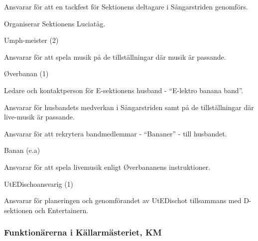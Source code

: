 \documentclass[10pt]{article}
\begin{document}
\begin{emptylist}
\begin{dashlist}
            \item Ansvarar för att en tackfest för Sektionens deltagare i Sångarstriden genomförs.
            \item Organiserar Sektionens Luciatåg.
        \end{dashlist}
    \item Umph-meister (2)
        \begin{dashlist}
        \item Ansvarar för att spela musik på de tillställningar där musik är passande.
        \end{dashlist}
    \item Øverbanan (1)
        \begin{dashlist}
        \item Ledare och kontaktperson för E-sektionens husband - “E-lektro banana band”.
        \item Ansvarar för husbandets medverkan i Sångarstriden samt på de tillställningar där live-musik är passande.
        \item Ansvarar för att rekrytera bandmedlemmar - “Bananer” - till husbandet.
        \end{dashlist}
    \item Banan (e.a)
        \begin{dashlist}
        \item Ansvarar för att spela livemusik enligt Øverbananens instruktioner.
        \end{dashlist}
    \item UtEDischoansvarig (1)
        \begin{dashlist}
        \item Ansvarar för planeringen och genomförandet av UtEDischot tillsammans med D-sektionen och Entertainern.
        \end{dashlist}
\end{emptylist}

\subsubsection{Funktionärerna i Källarmästeriet, KM}
\end{document}
